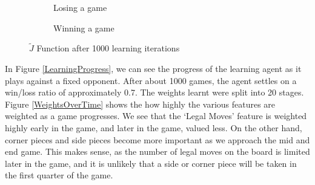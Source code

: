 \documentclass[11pt]{article}
\begin{document}
\begin{figure}[htbp]
  \begin{subfigure}{0.45\textwidth}
    \centering
    \caption{Losing a game}
    \label{fig:learned_j_lost}
  \end{subfigure}
  \hspace{1em}
  \begin{subfigure}{0.45\textwidth}
    \centering
    \caption{Winning a game}
    \label{fig:learned_j_win}
  \end{subfigure}
  \caption{$\tilde{J}$ Function after 1000 learning iterations}
  \label{fig:learned_j}
\end{figure}

In Figure \ref{LearningProgress}, we can see the progress of the learning
agent as it plays against a fixed opponent. After about 1000 games, the agent
settles on a win/loss ratio of approximately 0.7.  The weights learnt were
split into 20 stages. Figure \ref{WeightsOverTime} shows the how highly the
various features are weighted as a game progresses. We see that the `Legal
Moves' feature is weighted highly early in the game, and later in the game,
valued less. On the other hand, corner pieces and side pieces become more
important as we approach the mid and end game. This makes sense, as the number
of legal moves on the board is limited later in the game, and it is unlikely
that a side or corner piece will be taken in the first quarter of the game.
\end{document}
